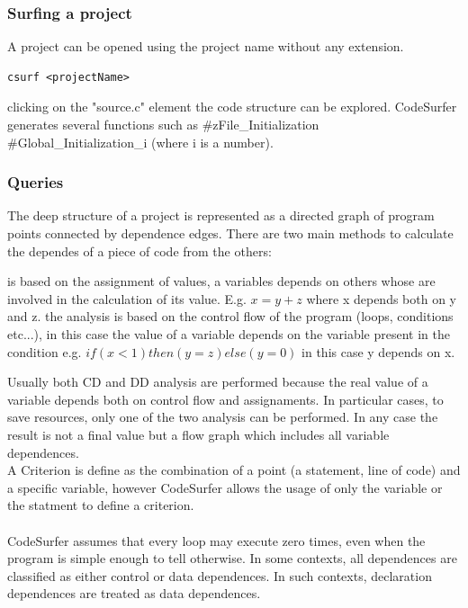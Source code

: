 \subsubsection{Surfing a project}
A project can be opened using the project name without any extension.
\begin{lstlisting}
csurf <projectName>
\end{lstlisting}
clicking on the "source.c" element the code structure can be explored. CodeSurfer generates several functions such as \#zFile\_Initialization \#Global\_Initialization\_i (where i is a number).


\subsubsection{Queries}
The deep structure of a project is represented as a directed graph of program points connected by dependence edges. There are two main methods to calculate the dependes of a piece of code from the others:
\begin{itemize}
	 is based on the assignment of values, a variables depends on others whose are involved in the calculation of its value. E.g. $x = y + z$ where x depends both on y and z.
	 the analysis is based on the control flow of the program (loops, conditions etc...), in this case the value of a variable depends on the variable present in the condition e.g. $if (x < 1) then (y = z) else (y = 0)$ in this case y depends on x.
\end{itemize}
Usually both CD and DD analysis are performed because the real value of a variable depends both on control flow and assignaments. In particular cases, to save resources, only one of the two analysis can be performed. In any case the result is not a final value but a flow graph which includes all variable dependences.\\
A Criterion is define as the combination of a point (a statement, line of code) and a specific variable, however CodeSurfer allows the usage of only the variable or the statment to define a criterion.
\\\\
CodeSurfer assumes that every loop may execute zero times, even when the program is simple enough to tell otherwise. In some contexts, all dependences are classified as either control or data dependences. In such contexts, declaration dependences are treated as data dependences.

